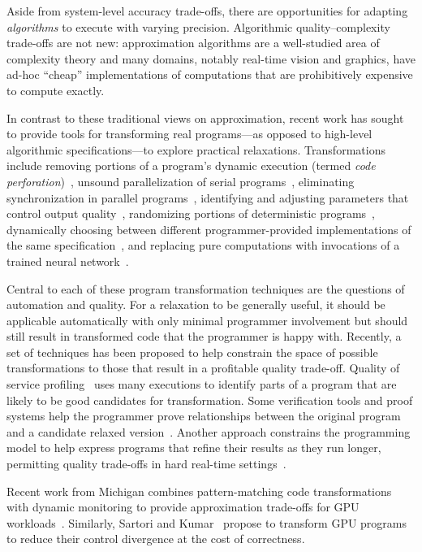 Aside from system-level accuracy trade-offs, there are opportunities for
adapting \emph{algorithms} to execute with varying precision. Algorithmic
quality--complexity trade-offs are not new: approximation algorithms are a
well-studied area of complexity theory and many domains, notably real-time
vision and graphics, have ad-hoc ``cheap'' implementations of computations
that are prohibitively expensive to compute exactly.

In contrast to these
traditional views on approximation, recent work has sought to provide
tools for transforming real programs---as opposed to high-level
algorithmic specifications---to explore practical relaxations.
Transformations include removing portions of a program's dynamic execution
(termed \emph{code perforation})~\cite{perforation}, unsound
parallelization of serial programs~\cite{quickstep}, eliminating
synchronization in parallel programs~\cite{dubstep, races-ibm, hogwild},
identifying and adjusting parameters that control output
quality~\cite{dynamicknobs}, randomizing portions of deterministic
programs~\cite{zhu-popl12, sasa-sas11}, dynamically choosing between
different programmer-provided implementations of the same
specification~\cite{green, virus, petabricks, taco-soc, ansel-autotuning}, and replacing pure computations with invocations
of a trained neural network~\cite{benchnn, temam-isca, emeuro}.

Central to each of these program transformation techniques are the questions
of automation and quality. For a relaxation to be generally useful, it should
be applicable automatically with only minimal programmer involvement but
should still result in transformed code that the programmer is happy with.
Recently, a set of techniques has been proposed to help constrain the space
of possible transformations to those that result in a profitable
quality trade-off. Quality of service profiling~\cite{qosprof} uses many
executions to identify parts of a program that are likely to be good
candidates for transformation. Some verification tools and proof systems help
the programmer prove relationships between the original program and a
candidate relaxed version~\cite{carbin-pldi, carbin-races, carbin-pepm,
rice-transformation-semantics}.
Another approach constrains the programming model to help express programs
that refine their results as they run longer, permitting quality trade-offs in
hard real-time settings~\cite{chung90}.

Recent work from Michigan combines pattern-matching code transformations with
dynamic monitoring to provide approximation trade-offs for GPU
workloads~\cite{paraprox, sage}.
Similarly, Sartori and Kumar~\cite{herding} propose to transform GPU programs
to reduce their control divergence at the cost of correctness.

